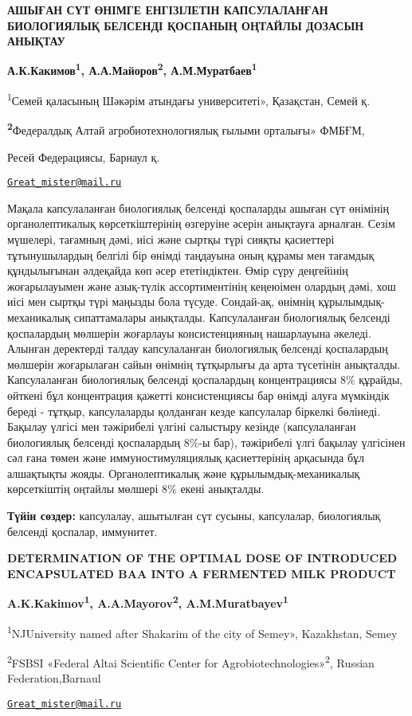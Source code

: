 \begin{center}
{\large\bfseries АШЫҒАН СҮТ ӨНІМГЕ ЕНГІЗІЛЕТІН КАПСУЛАЛАНҒАН БИОЛОГИЯЛЫҚ БЕЛСЕНДІ
ҚОСПАНЫҢ ОҢТАЙЛЫ ДОЗАСЫН АНЫҚТАУ}

{\bfseries А.К.Какимов\textsuperscript{1}, А.А.Майоров\textsuperscript{2},
А.М.Муратбаев\textsuperscript{1 }}

\textsuperscript{1}Семей қаласының Шәкәрім атындағы университеті», Қазақстан, Семей қ.

{\bfseries \textsuperscript{2}}Федералдық Алтай агробиотехнологиялық ғылыми
орталығы» ФМБҒМ,

Ресей Федерациясы, Барнаул қ.

\href{mailto:Great_mister@mail.ru}{\nolinkurl{Great\_mister@mail.ru}}
\end{center}

Мақала капсулаланған биологиялық белсенді қоспаларды ашыған сүт өнімінің
органолептикалық көрсеткіштерінің өзгеруіне әсерін анықтауға арналған.
Сезім мүшелері, тағамның дәмі, иісі және сыртқы түрі сияқты қасиеттері
тұтынушылардың белгілі бір өнімді таңдауына оның құрамы мен тағамдық
құндылығынан әлдеқайда көп әсер ететіндіктен. Өмір сүру деңгейінің
жоғарылауымен және азық-түлік ассортиментінің кеңеюімен олардың дәмі,
хош иісі мен сыртқы түрі маңызды бола түсуде. Сондай-ақ, өнімнің
құрылымдық-механикалық сипаттамалары анықталды. Капсулаланған
биологиялық белсенді қоспалардың мөлшерін жоғарлауы консистенцияның
нашарлауына әкеледі. Алынған деректерді талдау капсулаланған биологиялық
белсенді қоспалардың мөлшерін жоғарылаған сайын өнімнің тұтқырлығы да
арта түсетінін анықталды. Капсулаланған биологиялық белсенді қоспалардың
концентрациясы 8\% құрайды, өйткені бұл концентрация қажетті
консистенциясы бар өнімді алуға мүмкіндік береді - тұтқыр, капсулаларды
қолданған кезде капсулалар біркелкі бөлінеді. Бақылау үлгісі мен
тәжірибелі үлгіні салыстыру кезінде (капсулаланған биологиялық белсенді
қоспалардың 8\%-ы бар), тәжірибелі үлгі бақылау үлгісінен сәл ғана төмен
және иммуностимуляциялық қасиеттерінің арқасында бұл алшақтықты жояды.
Органолептикалық және құрылымдық-механикалық көрсеткіштің оңтайлы
мөлшері 8\% екені анықталды.

{\bfseries Түйін сөздер:} капсулалау, ашытылған сүт сусыны, капсулалар,
биологиялық белсенді қоспалар, иммунитет.

\begin{center}
{\large\bfseries DETERMINATION OF THE OPTIMAL DOSE OF INTRODUCED ENCAPSULATED BAA
INTO A FERMENTED MILK PRODUCT}

{\bfseries A.K.Kakimov\textsuperscript{1}, A.A.Mayorov\textsuperscript{2},
A.M.Muratbayev\textsuperscript{1}}

\textsuperscript{1}NJUniversity named after Shakarim of the city of
Semey», Kazakhstan, Semey

\textsuperscript{2}FSBSI «Federal Altai Scientific Center for
Agrobiotechnologies»\textsuperscript{2}, Russian Federation,Barnaul

\href{mailto:Great_mister@mail.ru}{\nolinkurl{Great\_mister@mail.ru}}
\end{center}


